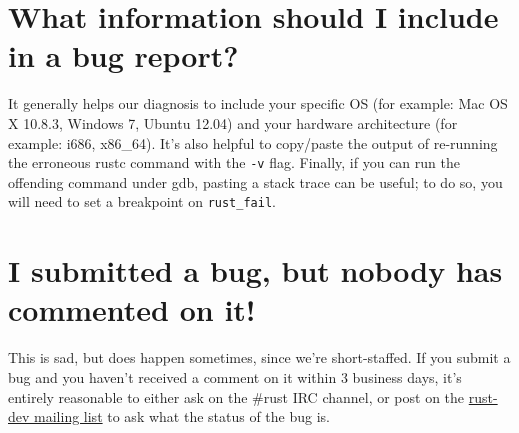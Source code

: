 \documentclass[]{article}
\begin{document}
\section{What information should I include in a bug
report?}\label{what-information-should-i-include-in-a-bug-report}

It generally helps our diagnosis to include your specific OS (for
example: Mac OS X 10.8.3, Windows 7, Ubuntu 12.04) and your hardware
architecture (for example: i686, x86\_64). It's also helpful to
copy/paste the output of re-running the erroneous rustc command with the
\texttt{-v} flag. Finally, if you can run the offending command under
gdb, pasting a stack trace can be useful; to do so, you will need to set
a breakpoint on \texttt{rust\_fail}.

\section{I submitted a bug, but nobody has commented on
it!}\label{i-submitted-a-bug-but-nobody-has-commented-on-it}

This is sad, but does happen sometimes, since we're short-staffed. If
you submit a bug and you haven't received a comment on it within 3
business days, it's entirely reasonable to either ask on the \#rust IRC
channel, or post on the
\href{https://mail.mozilla.org/listinfo/rust-dev}{rust-dev mailing list}
to ask what the status of the bug is.
\end{document}
